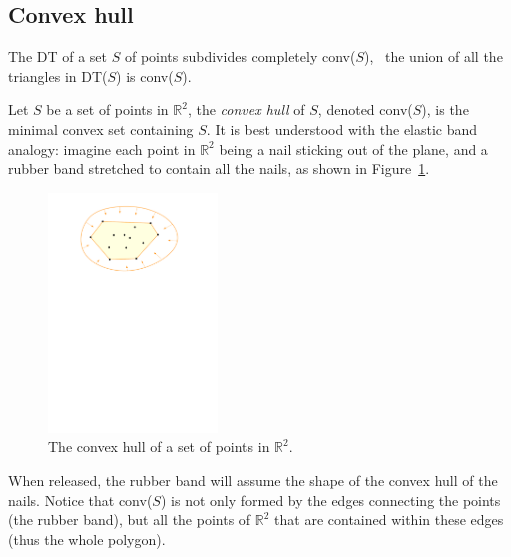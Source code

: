 %
\subsection{Convex hull}%
\label{sec:convexhull}

The DT of a set $S$ of points subdivides completely conv($S$), \ie\ the union of all the triangles in DT($S$) is conv($S$).

Let $S$ be a set of points in $\mathbb{R}^2$, the \emph{convex hull} of $S$, denoted conv($S$), is the minimal convex set containing $S$. 
It is best understood with the elastic band analogy: imagine each point in $\mathbb{R}^2$ being a nail sticking out of the plane, and a rubber band stretched to contain all the nails, as shown in Figure~\ref{fig:convex_hull}. 
\begin{figure}
  \centering
  \includegraphics[width=0.4\textwidth]{figs/convex_hull}
  \caption{The convex hull of a set of points in $\mathbb{R}^2$.}%
\label{fig:convex_hull}
\end{figure}
When released, the rubber band will assume the shape of the convex hull of the nails. 
Notice that conv($S$) is not only formed by the edges connecting the points (the rubber band), but all the points of $\mathbb{R}^2$ that are contained within these edges (thus the whole polygon).


%
